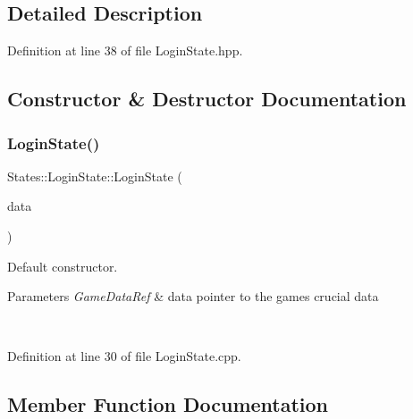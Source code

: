 \subsection{Detailed Description}


Definition at line 38 of file Login\+State.\+hpp.



\subsection{Constructor \& Destructor Documentation}
\mbox{\label{class_states_1_1_login_state_a73147b21ae7bc566d4394a25881e887b}} 
\subsubsection{\texorpdfstring{LoginState()}{LoginState()}}
{\footnotesize\ttfamily States\+::\+Login\+State\+::\+Login\+State (\begin{DoxyParamCaption}\item[{\mbox{\hyperlink{namespace_arktis_engine_a52e783ae007274e2a6eccc201d9400a5}{Arktis\+Engine\+::\+Game\+Data\+Ref}}}]{data }\end{DoxyParamCaption})}



Default constructor. 


\begin{DoxyParams}{Parameters}
{\em Game\+Data\+Ref} & data pointer to the game\textquotesingle{}s crucial data \begin{DoxyVerb}\end{DoxyVerb}
 \\
\hline
\end{DoxyParams}


Definition at line 30 of file Login\+State.\+cpp.


\begin{DoxyCode}{0}

\end{DoxyCode}


\subsection{Member Function Documentation}
\mbox{\label{class_states_1_1_login_state_aca115316c1aa308f39c6c95c47fd30f6}} 
